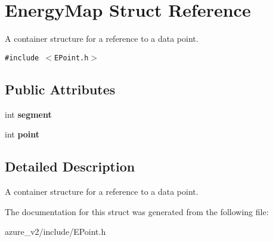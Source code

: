 \section{Energy\-Map Struct Reference}
\label{structEnergyMap}
A container structure for a reference to a data point.  


{\tt \#include $<$EPoint.h$>$}

\subsection*{Public Attributes}
\begin{CompactItemize}
\item 
int \textbf{segment}\label{structEnergyMap_7d4f6493b8c18290d90b3c03612d52ef}

\item 
int \textbf{point}\label{structEnergyMap_a72e3968fa350a0db9be8cbaef6d5b20}

\end{CompactItemize}


\subsection{Detailed Description}
A container structure for a reference to a data point. 



The documentation for this struct was generated from the following file:\begin{CompactItemize}
\item 
azure\_\-v2/include/EPoint.h\end{CompactItemize}
